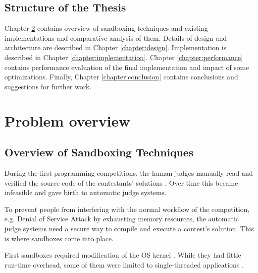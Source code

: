 \documentclass[en]{pracamgr}
\begin{document}


\section{Structure of the Thesis}

Chapter \ref{chapter:problem_overview} contains overview of sandboxing techniques and existing implementations and comparative analysis of them. Details of design and architecture are described in Chapter \ref{chapter:design}. Implementation is described in Chapter \ref{chapter:implementation}. Chapter \ref{chapter:performance} contains performance evaluation of the final implementation and impact of some optimizations. Finally, Chapter \ref{chapter:conclusion} contains conclusions and suggestions for further work.

\chapter{Problem overview}\label{chapter:problem_overview}

\section{Overview of Sandboxing Techniques}

During the first programming competitions, the human judges manually read and verified the source code of the contestants' solutions \cite{tochev2010validating}. Over time this became infeasible and gave birth to automatic judge systems.

To prevent people from interfering with the normal workflow of the competition, e.g. Denial of Service Attack by exhausting memory resources, the automatic judge systems need a secure way to compile and execute a contest's solution. This is where sandboxes come into place.

First sandboxes required modification of the OS kernel \cite{provos2003improving, garfinkel2004janus, garfinkel2004ostia, jana2011txbox, li2014minibox}. While they had little run-time overhead, some of them were limited to single-threaded applications \cite{merry2009using}.
\end{document}
